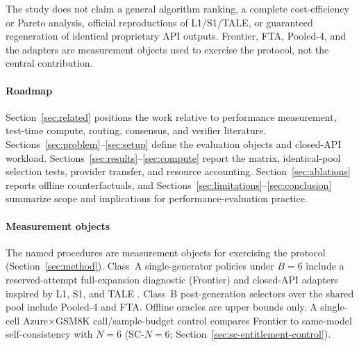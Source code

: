 The study does not claim a general algorithm ranking, a complete cost-efficiency or Pareto analysis,
official reproductions of L1/S1/TALE, or guaranteed regeneration of identical proprietary API
outputs. Frontier, FTA, Pooled-4, and the adapters are measurement objects used to exercise the
protocol, not the central contribution.

\paragraph{Roadmap}
Section~\ref{sec:related} positions the work relative to performance measurement, test-time
compute, routing, consensus, and verifier literature. Sections~\ref{sec:problem}--\ref{sec:setup}
define the evaluation objects and closed-API workload. Sections~\ref{sec:results}--\ref{sec:compute}
report the matrix, identical-pool selection tests, provider transfer, and resource accounting.
Section~\ref{sec:ablations} reports offline counterfactuals, and
Sections~\ref{sec:limitations}--\ref{sec:conclusion} summarize scope and implications for
performance-evaluation practice.

\paragraph{Measurement objects}
The named procedures are measurement objects for exercising the protocol
(Section~\ref{sec:method}). Class~A single-generator policies under $B{=}6$ include a
reserved-attempt full-expansion diagnostic (Frontier) and closed-API adapters inspired by L1, S1,
and TALE \citep{l1,s1,tale}. Class~B post-generation selectors over the shared pool include
Pooled-4 and FTA. Offline oracles are upper bounds only. A single-cell Azure$\times$GSM8K
call/sample-budget control compares Frontier to same-model self-consistency with $N{=}6$
(SC-$N{=}6$; Section~\ref{sec:sc-entitlement-control}).
